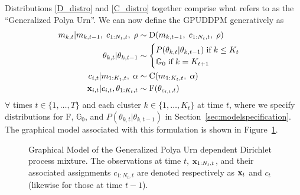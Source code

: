 \documentclass{article}
\begin{document}
Distributions \eqref{D_distro} and \eqref{C_distro} together comprise what \cite{caron_2007} refers to as the ``Generalized Polya Urn''. We can now define the GPUDDPM generatively as
\begin{align}
\label{gpuddpm_def}
\begin{split}
m_{k,t} | m_{k,t-1}, \hspace{1mm} c_{1:N_{t}, t}, \hspace{1mm} \rho  &\sim \text{D}(m_{k,t-1}, \hspace{1mm} c_{1:N_{t}, t}, \hspace{1mm} \rho) \\
\theta_{k, t} | \theta_{k, t-1}   & \sim
\begin{cases}
  P(\theta_{k, t} | \theta_{k, t-1}) \hspace{1mm} \text{if} \hspace{1mm} k \leq K_{t} \\ %
  \mathbb{G}_{0} \hspace{1mm} \text{if} \hspace{1mm} k = K_{t+1}
\end{cases} \\
c_{i,t} | m_{1:K_{t},t}, \hspace{1mm} \alpha  &\sim  \text{C} (m_{1:K_{t},t}, \hspace{1mm} \alpha) \\
\bold{x}_{i,t} | c_{i,t}, \theta_{1:K_{t}, t} &\sim \text{F}(\theta_{c_{i,t}, t})
\end{split}
\end{align}
$\forall$ times $t \in \{1, \ldots, T\}$ and each cluster $k \in \{ 1, \ldots, K_{t} \}$ at time $t$, where we specify distributions for F, $\mathbb{G}_{0}$, and $P(\theta_{k, t} | \theta_{k, t-1})$ in Section~\ref{sec:modelspecification}. The graphical model associated with this formulation is shown in Figure~\ref{fig:gpuddpm_gm_1}.
\begin{figure}[h]
        \caption{\label{fig:gpuddpm_gm_1} Graphical Model of the Generalized Polya Urn dependent Dirichlet process mixture. The observations at time $t$, $\bold{x}_{1:N_{t},t}$, and their associated assignments $c_{1:N_{t},t}$ are denoted respectively as $\bold{x}_{t}$ and $c_{t}$ (likewise for those at time $t-1$).}
\end{figure}
\end{document}
